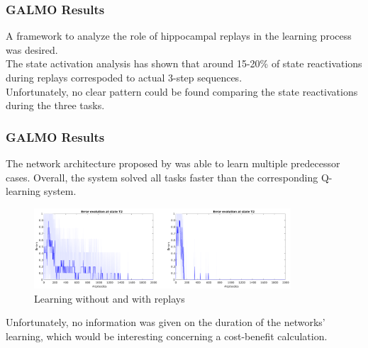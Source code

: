 \documentclass[ignorenonframetext]{beamer}
\begin{document}
\begin{frame}
\frametitle{GALMO Results}
A framework to analyze the role of hippocampal replays in the learning process was desired. \\
\vspace*{0.5cm}
The state activation analysis has shown that around 15-20\% of state reactivations during replays correspoded to actual 3-step sequences. 
\\Unfortunately, no clear pattern could be found comparing the state reactivations during the three tasks. 
\end{frame}
\begin{frame}
	\frametitle{GALMO Results}
	The network architecture proposed by \cite{NeuralDynaQ} was able to learn multiple predecessor cases. Overall, the system solved all tasks faster than the corresponding Q-learning system. 
	\begin{figure}
		\includegraphics[height=3cm]{figs/QvsDyna2}
		\caption{Learning without and with replays \cite{NeuralDynaQ}}
	\end{figure}
	Unfortunately, no information was given on the duration of the networks' learning, which would be interesting concerning a cost-benefit calculation.
\end{frame}
\end{document}
